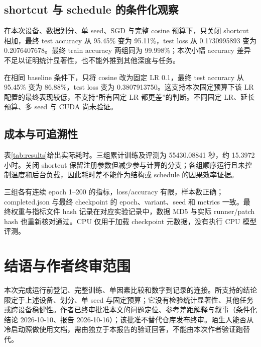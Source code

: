 \documentclass[conference]{IEEEtran}
\begin{document}
\subsection{shortcut 与 schedule 的条件化观察}
在本次设备、数据划分、单 seed、SGD 与完整 cosine 预算下，只关闭 shortcut 相加，最终 test accuracy 从 95.45\% 变为 95.11\%，test loss 从 0.1730995893 变为 0.2076407678\cite{exp05,exp06}。最终 train accuracy 两组同为 99.998\%；本次小幅 accuracy 差异不足以证明统计显著性，也不能外推到其他深度与任务。

在相同 baseline 条件下，只将 cosine 改为固定 LR 0.1，最终 test accuracy 从 95.45\% 变为 86.88\%，test loss 变为 0.3807913750\cite{exp07}。这支持本次固定预算下该 LR 配置的最终表现较低，不支持“所有固定 LR 都更差”的判断。不同固定 LR、延长预算、多 seed 与 CUDA 尚未验证。

\subsection{成本与可追溯性}
表\ref{tab:results}给出实际耗时。三组累计训练及评测为 55430.08841 秒，约 15.3972 小时\cite{exp07}。关闭 shortcut 保留注册参数但减少参与计算的分支；各组顺序运行且未控制温度和后台负载，因此耗时差不能作为结构或 schedule 的因果效率证据。

三组各有连续 epoch 1--200 的指标，loss/accuracy 有限，样本数正确；completed.json 与最终 checkpoint 的 epoch、variant、seed 和 metrics 一致\cite{exp05,exp06,exp07}。最终权重与指标文件 hash 记录在对应实验记录中，数据 MD5 与实际 runner/patch hash 也重新核对通过。CPU 仅用于加载 checkpoint 元数据，没有执行 CPU 模型评测。

\balance
\section{结语与作者终审范围}
本次完成运行前登记、完整训练、单因素比较和数字到记录的连接。所支持的结论限定于上述设备、划分、单 seed 与固定预算；它没有检验统计显著性、其他任务或跨设备稳健性。作者已终审批准本文的问题定位、参考差距解释与叙事（条件化结论 2026-10-10、报告 2026-10-16）；该批准不替代仓库发布终审。陌生人能否从冷启动照做使用文档，需由独立于本报告的验证回答，不能由本次作者验证跑替代。
\end{document}
